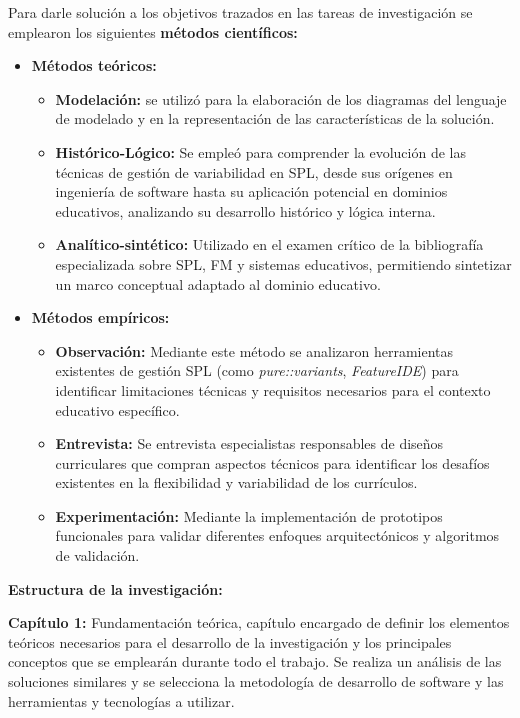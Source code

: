 Para darle solución a los objetivos trazados en las tareas de investigación se emplearon los
siguientes \textbf{métodos científicos:}

\begin{itemize}
    \item \textbf{Métodos teóricos:} 
        \begin{itemize}
            \item \textbf{Modelación:} se utilizó para la elaboración de los diagramas del lenguaje de
            modelado y en la representación de las características de la solución.
            \item \textbf{Histórico-Lógico:} Se empleó para comprender la evolución de las técnicas de
            gestión de variabilidad en \ac{SPL}, desde sus orígenes en ingeniería de software
            hasta su aplicación potencial en dominios educativos, analizando su desarrollo
            histórico y lógica interna.
            \item \textbf{Analítico-sintético:} Utilizado en el examen crítico de la bibliografía
            especializada sobre \ac{SPL}, \ac{FM} y sistemas educativos, permitiendo
            sintetizar un marco conceptual adaptado al dominio educativo.
        \end{itemize}
    \item \textbf{Métodos empíricos:}
        \begin{itemize}
            \item \textbf{Observación:} Mediante este método se analizaron herramientas
            existentes de gestión \ac{SPL} (como \textit{pure::variants}, \textit{FeatureIDE}) para
            identificar limitaciones técnicas y requisitos necesarios para el contexto
            educativo específico.
            \item \textbf{Entrevista:} Se entrevista especialistas responsables de diseños
            curriculares que compran aspectos técnicos para identificar los desafíos
            existentes en la flexibilidad y variabilidad de los currículos.
            \item \textbf{Experimentación:} Mediante la implementación de prototipos
            funcionales para validar diferentes enfoques arquitectónicos y algoritmos
            de validación.
        \end{itemize}
\end{itemize}


\textbf{Estructura de la investigación:}
 
\textbf{Capítulo 1:} Fundamentación teórica, capítulo encargado de definir los elementos teóricos
necesarios para el desarrollo de la investigación y los principales conceptos que se emplearán
durante todo el trabajo. Se realiza un análisis de las soluciones similares y se selecciona la
metodología de desarrollo de software y las herramientas y tecnologías a utilizar.

